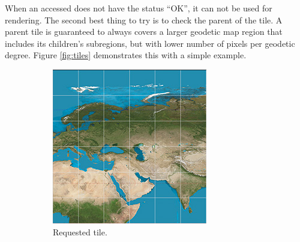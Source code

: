 When an accessed  does not have the status ``OK'', it can not be used for rendering. The second best thing to try is to check the parent of the tile. A parent tile is guaranteed to always covers a larger geodetic map region that includes its children's subregions, but with lower number of pixels per geodetic degree. Figure \ref{fig:tiles} demonstrates this with a simple example.

\begin{figure}[htbp]
    \centering
    \begin{subfigure}[t]{0.3\textwidth}
        \includegraphics[width=\textwidth]{figures/implementation/chunktile/chunktile1.jpg}
        \caption{Requested tile.}
    \end{subfigure}
    \quad
    \begin{subfigure}[t]{0.3\textwidth}

\end{subfigure}
\end{figure}
